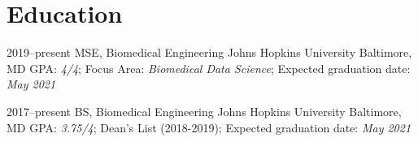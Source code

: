 \section{Education}

\cventry
{2019--present}
{MSE, Biomedical Engineering}
{Johns Hopkins University}
{Baltimore, MD}
{}
{
GPA: \textit{4/4}; 
Focus Area: \textit{Biomedical Data Science}; 
Expected graduation date: \textit{May 2021}
}

\cventry
{2017--present}
{BS, Biomedical Engineering}
{Johns Hopkins University}
{Baltimore, MD}
{}
{
GPA: \textit{3.75/4}; 
Dean's List (2018-2019);
{Expected graduation date:} \textit{May 2021}
}
